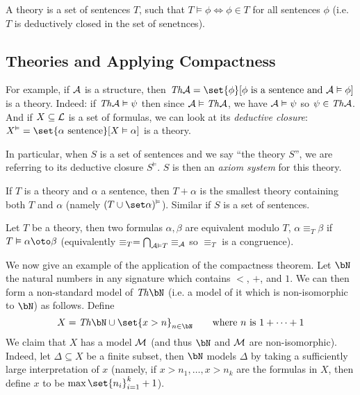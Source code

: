 \ethrm

\bdefn

    A {\emphcolor theory} is a set of sentences $T$, such that $T\vDash\phi\iff\phi\in T$ for all sentences $\phi$ (i.e. $T$ is
    deductively closed in the set of senetnces).

\edefn

\subsection{Theories and Applying Compactness}

For example, if ${\cal A}$ is a structure, then $\Th\c A=\set{\phi}[\hbox{$\phi$ is a sentence and $\c A\vDash\phi$}]$ is a theory.
Indeed: if ${\it Th}{\cal A}\vDash\psi$ then since ${\cal A}\vDash{\it Th}{\cal A}$, we have ${\cal A}\vDash\psi$ so $\psi\in{\it Th}{\cal A}$.
And if $X\subseteq{\cal L}$ is a set of formulas, we can look at its {\it deductive closure}:
$X^\vDash=\set{\alpha\hbox{ sentence}}[X\vDash\alpha]$ is a theory.

In particular, when $S$ is a set of sentences and we say ``the theory $S$'', we are referring to its deductive closure $S^\vDash$.
$S$ is then an {\it axiom system} for this theory.

If $T$ is a theory and $\alpha$ a sentence, then $T+\alpha$ is the smallest theory containing both $T$ and $\alpha$ (namely
$(T\cup\set\alpha)^\vDash$).
Similar if $S$ is a set of sentences.

\bdefn

    Let $T$ be a theory, then two formulas $\alpha,\beta$ are {\emphcolor equivalent modulo $T$}, $\alpha\equiv_T\beta$
    if $T\vDash\alpha\oto\beta$ (equivalently $\equiv_T=\bigcap_{{\cal A}\vDash T}\equiv_{{\cal A}}$ so $\equiv_T$ is a congruence).

\edefn

We now give an example of the application of the compactness theorem.
Let $\bN$ the natural numbers in any signature which contains $<$, $+$, and $1$.
We can then form a non-standard model of $\Th\bN$ (i.e. a model of it which is non-isomorphic to $\bN$) as follows.
Define
$$ X = \Th\bN \cup \set{x>n}_{n\in\bN}\qquad \hbox{where $n$ is $1+\cdots+1$} $$
We claim that $X$ has a model ${\cal M}$ (and thus $\bN$ and ${\cal M}$ are non-isomorphic).
Indeed, let $\Delta\subseteq X$ be a finite subset, then $\bN$ models $\Delta$ by taking a sufficiently large interpretation of $x$
(namely, if $x>n_1,\dots,x>n_k$ are the formulas in $X$, then define $x$ to be $\max\set{n_i}_{i=1}^k+1$).


